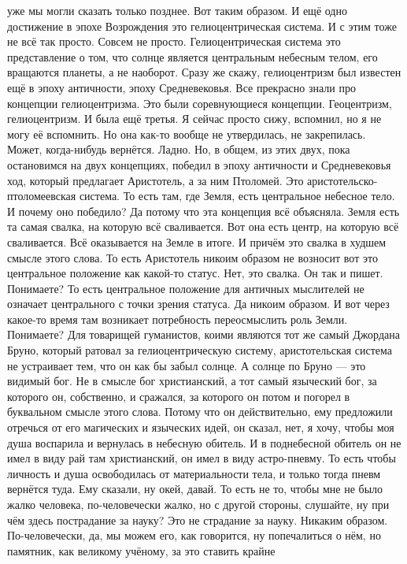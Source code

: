 уже мы могли сказать только позднее. Вот таким образом. И ещё одно достижение в
эпохе Возрождения это гелиоцентрическая система. И с этим тоже не всё так
просто. Совсем не просто. Гелиоцентрическая система это представление о том, что
солнце является центральным небесным телом, его вращаются планеты, а не
наоборот. Сразу же скажу, гелиоцентризм был известен ещё в эпоху античности,
эпоху Средневековья. Все прекрасно знали про концепции гелиоцентризма. Это были
соревнующиеся концепции. Геоцентризм, гелиоцентризм. И была ещё третья. Я сейчас
просто сижу, вспомнил, но я не могу её вспомнить. Но она как-то вообще не
утвердилась, не закрепилась. Может, когда-нибудь вернётся. Ладно. Но, в общем,
из этих двух, пока остановимся на двух концепциях, победил в эпоху античности и
Средневековья ход, который предлагает Аристотель, а за ним Птоломей. Это
аристотельско-птоломеевская система. То есть там, где Земля, есть центральное
небесное тело. И почему оно победило? Да потому что эта концепция всё объясняла.
Земля есть та самая свалка, на которую всё сваливается. Вот она есть центр, на
которую всё сваливается. Всё оказывается на Земле в итоге. И причём это свалка в
худшем смысле этого слова. То есть Аристотель никоим образом не возносит вот это
центральное положение как какой-то статус. Нет, это свалка. Он так и пишет.
Понимаете? То есть центральное положение для античных мыслителей не означает
центрального с точки зрения статуса. Да никоим образом. И вот через какое-то
время там возникает потребность переосмыслить роль Земли. Понимаете? Для
товарищей гуманистов, коими являются тот же самый Джордана Бруно, который
ратовал за гелиоцентрическую систему, аристотельская система не устраивает тем,
что он как бы забыл солнце. А солнце по Бруно — это видимый бог. Не в смысле бог
христианский, а тот самый языческий бог, за которого он, собственно, и сражался,
за которого он потом и погорел в буквальном смысле этого слова. Потому что он
действительно, ему предложили отречься от его магических и языческих идей, он
сказал, нет, я хочу, чтобы моя душа воспарила и вернулась в небесную обитель. И
в поднебесной обитель он не имел в виду рай там христианский, он имел в виду
астро-пневму. То есть чтобы личность и душа освободилась от материальности тела,
и только тогда пневм вернётся туда. Ему сказали, ну окей, давай. То есть не то,
чтобы мне не было жалко человека, по-человечески жалко, но с другой стороны,
слушайте, ну при чём здесь пострадание за науку? Это не страдание за науку.
Никаким образом. По-человечески, да, мы можем его, как говорится, ну
попечалиться о нём, но памятник, как великому учёному, за это ставить крайне
